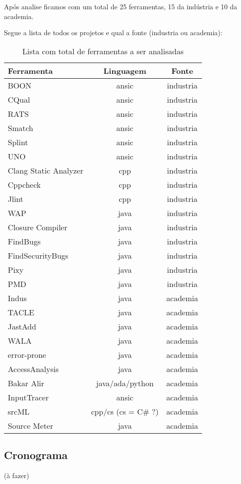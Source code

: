 \documentclass[12pt]{article}
\begin{document}
Após analise ficamos com um total de 25 ferramentas, 15 da indústria e 10 da
academia.

Segue a lista de todos os projetos e qual a fonte (industria ou academia):

\begin{table}
\caption{Lista com total de ferramentas a ser analisadas}
\centering
\begin{tabular}{| l | c | c |}
\hline
Ferramenta & Linguagem & Fonte \\
\hline
BOON                  & ansic                & industria \\
CQual                 & ansic                & industria \\
RATS                  & ansic                & industria \\
Smatch                & ansic                & industria \\
Splint                & ansic                & industria \\
UNO                   & ansic                & industria \\
Clang Static Analyzer & cpp                  & industria \\
Cppcheck              & cpp                  & industria \\
Jlint                 & cpp                  & industria \\
WAP                   & java                 & industria \\
Closure Compiler      & java                 & industria \\
FindBugs              & java                 & industria \\
FindSecurityBugs      & java                 & industria \\
Pixy                  & java                 & industria \\
PMD                   & java                 & industria \\
Indus                 & java                 & academia  \\
TACLE                 & java                 & academia  \\
JastAdd               & java                 & academia  \\
WALA                  & java                 & academia  \\
error-prone           & java                 & academia  \\
AccessAnalysis        & java                 & academia  \\
Bakar Alir            & java/ada/python      & academia  \\
InputTracer           & ansic                & academia  \\
srcML                 & cpp/cs (cs = C\# ?)   & academia  \\
Source Meter          & java                 & academia  \\
\hline
\end{tabular}
\label{total-de-ferramentas}
\end{table}

\subsection{Cronograma}

(à fazer)


\end{document}
